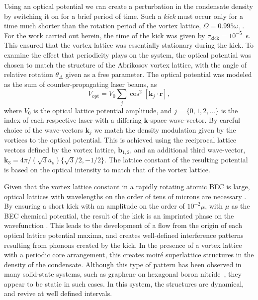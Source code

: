 Using an optical potential we can create a perturbation in the condensate density by switching it on for a brief period of time. Such a {\it kick} must occur only for a time much shorter than the rotation period of the vortex lattice, $\Omega = 0.995\omega_\perp$. For the work carried out herein, the time of the kick was given by $\tau_{\text{kick}}=10^{-5}$~s. This ensured that the vortex lattice was essentially stationary during the kick. To examine the effect that periodicity plays on the system, the optical potential was chosen to match the structure of the Abrikosov vortex lattice, with the angle of relative rotation $\theta_\Delta$ given as a free parameter. The optical potential was modeled as the sum of counter-propagating laser beams, as
\begin{equation}
    V_{\text{opt}} = V_0\displaystyle\sum_{j}\cos^2 \left[ \textbf{k}_{j}\cdot\textbf{r} \right],
\end{equation}
where $V_0$ is the optical lattice potential amplitude, and $j=\lbrace 0,1,2,\ldots \rbrace$ is the index of each respective laser with a differing $\mathbf{k}$-space wave-vector. By careful choice of the wave-vectors $\textbf{k}_{j}$ we match the density modulation given by the vortices to the optical potential. This is achieved using the reciprocal lattice vectors defined by the vortex lattice, $\mathbf{b}_{1,2}$, and an additional third wave-vector, $\mathbf{k}_3 = 4\pi/(\sqrt{3}a_o)\{\sqrt{3}/2,-1/2\}$. The lattice constant of the resulting potential is based on the optical intensity to match that of the vortex lattice.


Given that the vortex lattice constant in a rapidly rotating atomic BEC is large, optical lattices with wavelengths on the order of tens of microns are necessary \cite{BEC:Fallani_optexp_2005, AO:Williams_optexp_2008}. By ensuring a short kick with an amplitude on the order of $10^{-2} \mu $, with $\mu$ as the BEC chemical potential, the result of the kick is an imprinted phase on the wavefunction \cite{Vtx:Dobrek_pra_1999}. This leads to the development of a flow from the origin of each optical lattice potential maxima, and creates well-defined interference patterns resulting from phonons created by the kick. In the presence of a vortex lattice with a periodic core arrangement, this creates moir\'e superlattice structures \cite{SS:Murata_acsn_2010} in the density of the condensate. Although this type of pattern has been observed in many solid-state systems, such as graphene on hexagonal boron nitride~\cite{SS:Yankowitz_natphys_2012}, they appear to be static in such cases. In this system, the structures are dynamical, and revive at well defined intervals.

